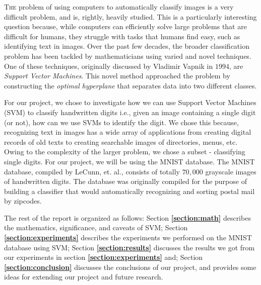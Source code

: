 
\lettrine[nindent=0em,lines=2]{T}{he} problem of using computers to automatically classify images is a very difficult problem, and is, rightly, heavily studied. This is a particularly interesting question because, while computers can efficiently solve large problems that are difficult for humans, they struggle with tasks that humans find easy, such as identifying text in images. Over the past few decades, the broader classification problem has been tackled by mathematicians using varied and novel techniques. One of these techniques, originally discussed by Vladimir Vapnik in $1994$, are \textit{Support Vector Machines}\cite{statistical-learning}. This novel method approached the problem by constructing the \textit{optimal hyperplane} that separates data into two different classes.

For our project, we chose to investigate how we can use Support Vector Machines (SVM) to classify handwritten digits i.e., given an image containing a single digit (or not), how can we use SVMs to identify the digit. We chose this because, recognizing text in images has a wide array of applications from creating digital records of old texts to creating searchable images of directories, menus, etc. Owing to the complexity of the larger problem, we chose a subset - classifying single digits. For our project, we will be using the MNIST database\cite{mnist}. The MNIST database, compiled by LeCunn, et. al., consists of totally $70,000$ grayscale images of handwritten digits. The database was originally compiled for the purpose of building a classifier that would automatically recognizing and sorting postal mail by zipcodes.

The rest of the report is organized as follows: Section \textbf{\ref{section:math}} describes the mathematics, significance, and caveats of SVM; Section \textbf{\ref{section:experiments}} describes the experiments we performed on the MNIST database using SVM; Section \textbf{\ref{section:results}} discusses the results we got from our experiments in section \textbf{\ref{section:experiments}} and; Section \textbf{\ref{section:conclusion}} discusses the conclusions of our project, and provides some ideas for extending our project and future research.